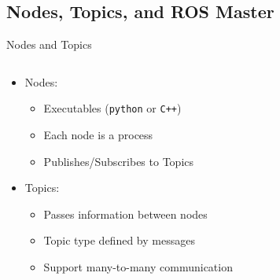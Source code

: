 \documentclass{beamer}
\begin{document}
\subsection{Nodes, Topics, and ROS Master}
\begin{frame}{Nodes and Topics}
	\begin{columns}[c]
		\begin{column}{0.6\textwidth}
			\begin{itemize}
				\item Nodes:
					\begin{itemize}
					\item Executables (\texttt{python} or \texttt{C++})
					\item Each node is a process
					\item Publishes/Subscribes to Topics
					\end{itemize}
				\item Topics:
					\begin{itemize}
					\item Passes information between nodes
					\item Topic type defined by messages
					\item Support many-to-many communication
					\end{itemize}
			\end{itemize}
		\end{column}
		\begin{column}{0.4\textwidth}
		\end{column}
	\end{columns}
\end{frame}
\end{document}
